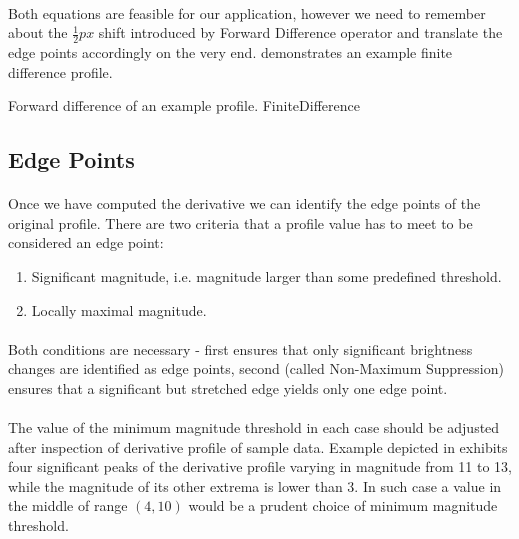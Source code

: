 \paragraph*{}
Both equations are feasible for our application, however we need to remember about the $\frac{1}{2}px$ shift introduced by Forward Difference operator and translate the edge points accordingly on the very end. 
 demonstrates an example finite difference profile.

\profileFigure
{
}
{Forward difference of an example profile.}
{FiniteDifference}


\subsection{Edge Points}
\paragraph*{}
Once we have computed the derivative we can identify the edge points of the original profile. There are two criteria that a profile value has to meet to be considered an edge point:
\begin{enumerate}
	\item Significant magnitude, i.e. magnitude larger than some predefined threshold.
	\item Locally maximal magnitude.
\end{enumerate}

\paragraph*{}
Both conditions are necessary - first ensures that only significant brightness changes are identified as edge points, second (called Non-Maximum Suppression) ensures that a significant but stretched edge yields only one edge point.

\paragraph*{}
The value of the minimum magnitude threshold in each case should be adjusted after inspection of derivative profile of sample data. Example depicted in  exhibits four significant peaks of the derivative profile varying in magnitude from 11 to 13, while the magnitude of its other extrema is lower than 3. In such case a value in the middle of range $(4, 10)$ would be a prudent choice of minimum magnitude threshold.

